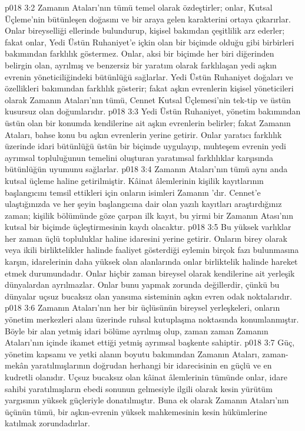 \vs p018 3:2 Zamanın Ataları’nın tümü temel olarak özdeştirler; onlar, Kutsal Üçleme’nin bütünleşen doğasını ve bir araya gelen karakterini ortaya çıkarırlar. Onlar bireyselliği ellerinde bulundurup, kişisel bakımdan çeşitlilik arz ederler; fakat onlar, Yedi Üstün Ruhaniyet’e içkin olan bir biçimde olduğu gibi birbirleri bakımından farklılık göstermez. Onlar, aksi bir biçimde her biri diğerinden belirgin olan, ayrılmış ve benzersiz bir yaratım olarak farklılaşan yedi aşkın evrenin yöneticiliğindeki bütünlüğü sağlarlar. Yedi Üstün Ruhaniyet doğaları ve özellikleri bakımından farklılık gösterir; fakat aşkın evrenlerin kişisel yöneticileri olarak Zamanın Ataları’nın tümü, Cennet Kutsal Üçlemesi’nin tek\hyp{}tip ve üstün kusursuz olan doğumlarıdır.
\vs p018 3:3 Yedi Üstün Ruhaniyet, yönetim bakımından üstün olan bir konumda kendilerine ait aşkın evrenlerin  belirler; fakat Zamanın Ataları, bahse konu bu aşkın evrenlerin  yerine getirir. Onlar yaratıcı farklılık üzerinde idari bütünlüğü üstün bir biçimde uygulayıp, muhteşem evrenin yedi ayrımsal topluluğunun temelini oluşturan yaratımsal farklılıklar karşısında bütünlüğün uyumunu sağlarlar.
\vs p018 3:4 Zamanın Ataları’nın tümü aynı anda kutsal üçleme haline getirilmiştir. Kâinat âlemlerinin kişilik kayıtlarının başlangıcını temsil ettikleri için onların isimleri Zamanın ’dır. Cennet’e ulaştığınızda ve her şeyin başlangıcına dair olan yazılı kayıtları araştırdığınız zaman; kişilik bölümünde göze çarpan ilk kayıt, bu yirmi bir Zamanın Atası’nın kutsal bir biçimde üçleştirmesinin kaydı olacaktır.
\vs p018 3:5 Bu yüksek varlıklar her zaman üçlü topluluklar haline idaresini yerine getirir. Onların birey olarak veya ikili birliktelikler halinde faaliyet gösterdiği eylemin birçok fazı bulunmasına karşın, idarelerinin daha yüksek olan alanlarında onlar birliktelik halinde hareket etmek durumundadır. Onlar hiçbir zaman bireysel olarak kendilerine ait yerleşik dünyalardan ayrılmazlar. Onlar bunu yapmak zorunda değillerdir, çünkü bu dünyalar uçsuz bucaksız olan yansıma sisteminin aşkın evren odak noktalarıdır.
\vs p018 3:6 Zamanın Ataları’nın her bir üçlüsünün bireysel yerleşkeleri, onların yönetim merkezleri alanı üzerinde ruhsal kutuplaşma noktasında konumlanmıştır. Böyle bir alan yetmiş idari bölüme ayrılmış olup, zaman zaman Zamanın Ataları’nın içinde ikamet ettiği yetmiş ayrımsal başkente sahiptir.
\vs p018 3:7 Güç, yönetim kapsamı ve yetki alanın boyutu bakımından Zamanın Ataları, zaman\hyp{}mekân yaratılmışlarının doğrudan herhangi bir idarecisinin en güçlü ve en kudretli olanıdır. Uçsuz bucaksız olan kâinat âlemlerinin tümünde onlar, idare sahibi yaratılmışların ebedi sonunun gelmesiyle ilgili olarak kesin yürütüm yargısının yüksek güçleriyle donatılmıştır. Buna ek olarak Zamanın Ataları’nın üçünün tümü, bir aşkın\hyp{}evrenin yüksek mahkemesinin kesin hükümlerine katılmak zorundadırlar.
